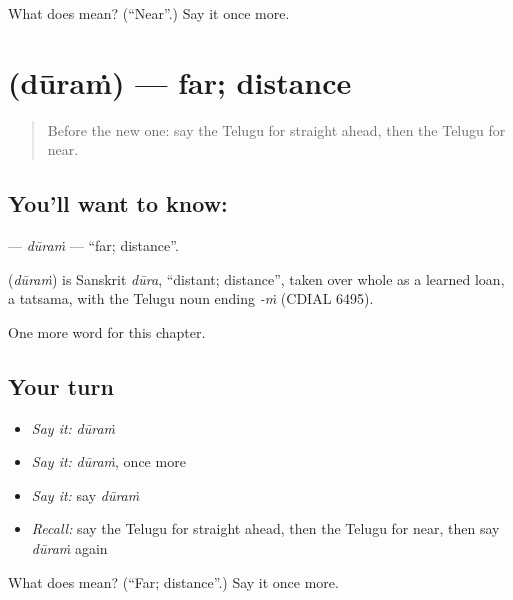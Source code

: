 \begin{tcolorbox}[breakable,colback=teal!4,colframe=teal!35!black,title={Before you move on}]
What does  mean? (\textquotedblleft{}Near\textquotedblright{}.) Say it once more.
\end{tcolorbox}
\section[\texorpdfstring{\te{దూరం} (dūraṁ)}{దూరం (dūraṁ)}]{ (dūraṁ) — far; distance}

\label{lesson:TE-C100-duram}



\begin{quote}
Before the new one: say the Telugu for straight ahead, then the Telugu for near.
\end{quote}

\subsection*{You'll want to know: }
\textbf{} — \emph{dūraṁ} — \textquotedblleft{}far; distance\textquotedblright{}.

\begin{cousinweb}
\textbf{} (\emph{dūraṁ}) is Sanskrit \emph{dūra}, \textquotedblleft{}distant; distance\textquotedblright{}, taken over whole as a learned loan, a tatsama, with the Telugu noun ending \emph{-ṁ} (CDIAL 6495).
\end{cousinweb}

\begin{grammarlens}[title={What you've built}]
One more word for this chapter.
\end{grammarlens}

\subsection*{Your turn}
\begin{itemize}
\raggedright
  \item \emph{Say it:} \emph{dūraṁ}
  \item \emph{Say it:} \emph{dūraṁ}, once more
  \item \emph{Say it:} say \emph{dūraṁ}
  \item \emph{Recall:} say the Telugu for straight ahead, then the Telugu for near, then say \emph{dūraṁ} again
\end{itemize}

\begin{tcolorbox}[breakable,colback=teal!4,colframe=teal!35!black,title={Before you move on}]
What does  mean? (\textquotedblleft{}Far; distance\textquotedblright{}.) Say it once more.
\end{tcolorbox}
